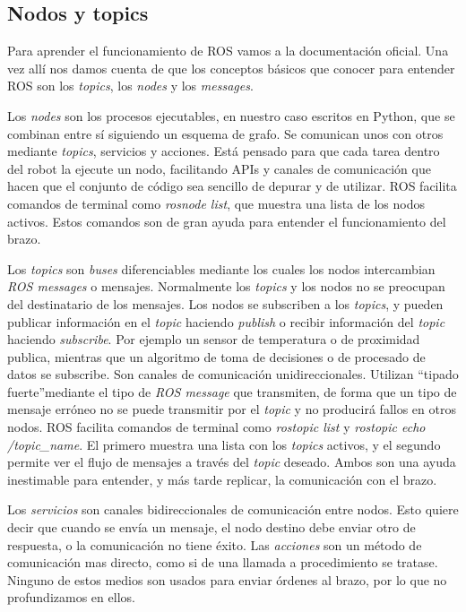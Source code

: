 \subsection{Nodos y topics}
\label{subsec:br_nodosytopics}

Para aprender el funcionamiento de ROS vamos a la documentación oficial\cite{roswiki}. Una vez allí nos damos cuenta de que los conceptos básicos que conocer para entender ROS son los \textit{topics}, los \textit{nodes} y  los \textit{messages}. 

Los \textit{nodes} son los procesos ejecutables, en nuestro caso escritos en Python, que se combinan entre sí siguiendo un esquema de grafo. Se comunican unos con otros mediante \textit{topics}, servicios y acciones. Está pensado para que cada tarea dentro del robot la ejecute un nodo, facilitando APIs y canales de comunicación que hacen que el conjunto de código sea sencillo de depurar y de utilizar. ROS facilita comandos de terminal como \textit{rosnode list}, que muestra una lista de los nodos activos. Estos comandos son de gran ayuda para entender el funcionamiento del brazo.

Los \textit{topics} son \textit{buses} diferenciables mediante los cuales los nodos intercambian \textit{ROS messages} o mensajes. Normalmente los \textit{topics} y los nodos no se preocupan del destinatario de los mensajes. Los nodos se subscriben a los \textit{topics}, y pueden publicar información en el \textit{topic} haciendo \textit{publish} o recibir información del \textit{topic} haciendo \textit{subscribe}. Por ejemplo un sensor de temperatura o de proximidad publica, mientras que un algoritmo de toma de decisiones o de procesado de datos se subscribe. Son canales de comunicación unidireccionales. Utilizan \textquotedblleft tipado fuerte\textquotedblright  mediante el tipo de \textit{ROS message} que transmiten, de forma que un tipo de mensaje erróneo no se puede transmitir por el \textit{topic} y no producirá fallos en otros nodos. ROS facilita comandos de terminal como \textit{rostopic list} y \textit{rostopic echo /topic\_name}. El primero muestra una lista con los \textit{topics} activos, y el segundo permite ver el flujo de mensajes a través del \textit{topic} deseado. Ambos son una ayuda inestimable para entender, y más tarde replicar, la comunicación con el brazo.

Los \textit{servicios} son canales bidireccionales de comunicación entre nodos. Esto quiere decir que cuando se envía un mensaje, el nodo destino debe enviar otro de respuesta, o la comunicación no tiene éxito. Las \textit{acciones} son un método de comunicación mas directo, como si de una llamada a procedimiento se tratase. Ninguno de estos medios son usados para enviar órdenes al brazo, por lo que no profundizamos en ellos.

